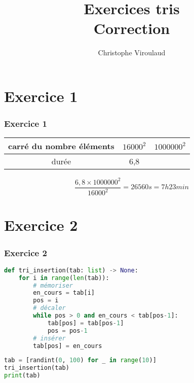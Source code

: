\documentclass[svgnames,11pt]{beamer}
\author[]{Christophe Viroulaud}
\title{Exercices tris\\Correction}
\date{\framebox{\textbf{Algo 05}}}
\institute{Première - NSI}
\begin{document}
\begin{frame}
\titlepage
\end{frame}
\section{Exercice 1}
\begin{frame}
    \frametitle{Exercice 1}
    \begin{center}    \renewcommand{\arraystretch}{2}

        \begin{tabular}{|c|c|c|}
            \hline
            carré du nombre éléments&$16000^2$&$1000000^2$\\
            \hline
            durée&6,8&\\
            \hline
        \end{tabular}    \renewcommand{\arraystretch}{1}

    \end{center}

    $$\dfrac{6,8×1000000^2}{16000^2}=26560s = 7h23min$$


\end{frame}
\section{Exercice 2}
\begin{frame}[fragile]
    \frametitle{Exercice 2}
\begin{center}
\begin{lstlisting}[language=Python , basicstyle=\ttfamily\small, xleftmargin=0.2em, xrightmargin=0em]
def tri_insertion(tab: list) -> None:
    for i in range(len(tab)):
        # mémoriser
        en_cours = tab[i]
        pos = i
        # décaler
        while pos > 0 and en_cours < tab[pos-1]:
            tab[pos] = tab[pos-1]
            pos = pos-1
        # insérer
        tab[pos] = en_cours
\end{lstlisting}
\begin{lstlisting}[language=Python , basicstyle=\ttfamily\small, xleftmargin=0.2em, xrightmargin=0em]
tab = [randint(0, 100) for _ in range(10)]
tri_insertion(tab)
print(tab)
\end{lstlisting}
\end{center}
    

\end{frame}
\end{document}
